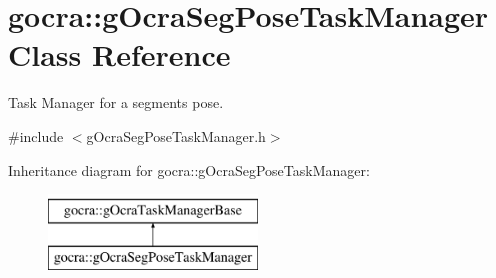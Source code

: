 \hypertarget{classgocra_1_1gOcraSegPoseTaskManager}{}\section{gocra\+:\+:g\+Ocra\+Seg\+Pose\+Task\+Manager Class Reference}
\label{classgocra_1_1gOcraSegPoseTaskManager}


Task Manager for a segment\textquotesingle{}s pose.  




{\ttfamily \#include $<$g\+Ocra\+Seg\+Pose\+Task\+Manager.\+h$>$}

Inheritance diagram for gocra\+:\+:g\+Ocra\+Seg\+Pose\+Task\+Manager\+:\begin{figure}[H]
\begin{center}
\leavevmode
\includegraphics[height=2.000000cm]{d7/d78/classgocra_1_1gOcraSegPoseTaskManager}
\end{center}
\end{figure}
